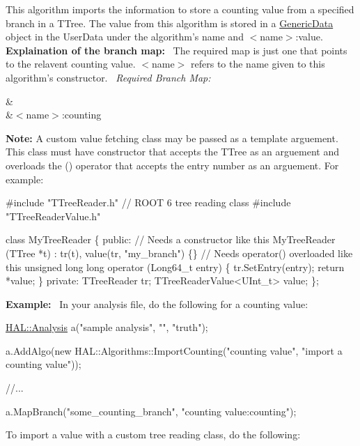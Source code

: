 This algorithm imports the information to store a counting value from a specified branch in a T\+Tree. The value from this algorithm is stored in a \hyperlink{class_h_a_l_1_1_generic_data}{Generic\+Data} object in the User\+Data under the algorithm's name and $<$name$>$\+:value.~\newline
~\newline
{\bfseries Explaination of the branch map\+:}~\newline
The required map is just one that points to the relavent counting value. $<$name$>$ refers to the name given to this algorithm's constructor.~\newline
{\itshape Required Branch Map\+:} \begin{TabularC}{2}
\hline
{}&\PBS{}\\
&\PBS\centering $<$name$>$\+:counting \\
\end{TabularC}
{\bfseries Note\+:} A custom value fetching class may be passed as a template arguement. This class must have constructor that accepts the T\+Tree as an arguement and overloads the () operator that accepts the entry number as an arguement. For example\+: 
\begin{DoxyCode}
\textcolor{preprocessor}{#include "TTreeReader.h"} \textcolor{comment}{// ROOT 6 tree reading class}
\textcolor{preprocessor}{#include "TTreeReaderValue.h"}

\textcolor{keyword}{class }MyTreeReader \{
\textcolor{keyword}{public}:
 \textcolor{comment}{// Needs a constructor like this}
 MyTreeReader (TTree *t) : tr(t), value(tr, \textcolor{stringliteral}{"my\_branch"}) \{\}
 \textcolor{comment}{// Needs operator() overloaded like this}
 \textcolor{keywordtype}{unsigned} \textcolor{keywordtype}{long} \textcolor{keywordtype}{long} operator (Long64\_t entry) \{
   tr.SetEntry(entry);
   \textcolor{keywordflow}{return} *value;
 \}
\textcolor{keyword}{private}:
 TTreeReader tr;
 TTreeReaderValue<UInt\_t> value;
\};
\end{DoxyCode}
 {\bfseries Example\+:}~\newline
In your analysis file, do the following for a counting value\+:


\begin{DoxyCode}
\hyperlink{class_h_a_l_1_1_analysis}{HAL::Analysis} a(\textcolor{stringliteral}{"sample analysis"}, \textcolor{stringliteral}{""}, \textcolor{stringliteral}{"truth"});

a.AddAlgo(\textcolor{keyword}{new} HAL::Algorithms::ImportCounting(\textcolor{stringliteral}{"counting value"}, \textcolor{stringliteral}{"import a counting value"}));

\textcolor{comment}{//...}

a.MapBranch(\textcolor{stringliteral}{"some\_counting\_branch"}, \textcolor{stringliteral}{"counting value:counting"});
\end{DoxyCode}
 To import a value with a custom tree reading class, do the following\+:


